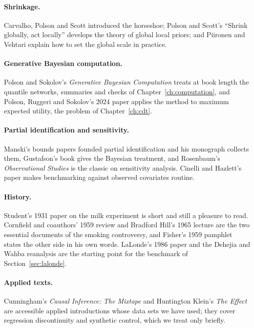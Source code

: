 \paragraph{Shrinkage.} Carvalho, Polson and Scott introduced the horseshoe; Polson and Scott's ``Shrink globally, act locally'' develops the theory of global local priors; and Piironen and Vehtari explain how to set the global scale in practice.

\paragraph{Generative Bayesian computation.} Polson and Sokolov's \emph{Generative Bayesian Computation} treats at book length the quantile networks, summaries and checks of Chapter~\ref{ch:computation}, and Polson, Ruggeri and Sokolov's 2024 paper applies the method to maximum expected utility, the problem of Chapter~\ref{ch:cdt}.

\paragraph{Partial identification and sensitivity.} Manski's bounds papers founded partial identification and his monograph collects them, Gustafson's book gives the Bayesian treatment, and Rosenbaum's \emph{Observational Studies} is the classic on sensitivity analysis. Cinelli and Hazlett's paper makes benchmarking against observed covariates routine.

\paragraph{History.} Student's 1931 paper on the milk experiment is short and still a pleasure to read. Cornfield and coauthors' 1959 review and Bradford Hill's 1965 lecture are the two essential documents of the smoking controversy, and Fisher's 1959 pamphlet states the other side in his own words. LaLonde's 1986 paper and the Dehejia and Wahba reanalysis are the starting point for the benchmark of Section~\ref{sec:lalonde}.

\paragraph{Applied texts.} Cunningham's \emph{Causal Inference: The Mixtape} and Huntington Klein's \emph{The Effect} are accessible applied introductions whose data sets we have used; they cover regression discontinuity and synthetic control, which we treat only briefly.
